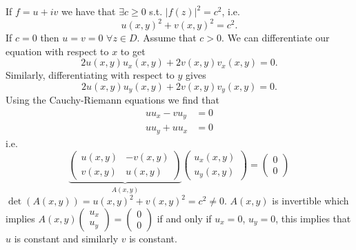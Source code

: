 \documentclass[10pt, a4paper]{article}
\begin{document}
\begin{problem}
\begin{solution}
        If $f = u + iv$ we have that $\exists c \geq 0$ s.t. $|f(z)| ^ 2 = c ^ 2$,
        i.e.
        \[
        u(x, y) ^ 2 + v(x, y) ^ 2 = c ^ 2.
        \]
        If $c = 0$ then $u = v = 0$ $\forall z \in D$.
        Assume that $c > 0$.
        We can differentiate our equation with respect to $x$ to get
        \[
        2u(x, y)u_x(x, y) + 2v(x, y)v_x(x, y) = 0.
        \]
        Similarly,
        differentiating with respect to $y$ gives
        \[
        2u(x, y)u_y(x, y) + 2v(x, y)v_y(x, y) = 0.
        \]
        Using the Cauchy-Riemann equations we find that
        \begin{align*}
            uu_x - vu_y &= 0 \\
            uu_y + uu_x &= 0
        \end{align*}
        i.e.
        \[
        \underbrace{\begin{pmatrix}
            u(x, y)  & -v(x, y) \\ v(x, y) & u(x, y)
        \end{pmatrix}}_{A(x, y)}
        \begin{pmatrix}
            u_x(x, y) \\ u_y(x, y)
        \end{pmatrix} = \begin{pmatrix}
            0 \\ 0
        \end{pmatrix}
        \]
        $\det(A(x, y)) = u(x, y) ^ 2 + v(x, y) ^ 2 = c ^ 2 \neq 0$.
        $A(x, y)$ is invertible which implies $A(x, y)\begin{pmatrix}
            u_x \\ u_y
        \end{pmatrix} = \begin{pmatrix}
            0 \\ 0
        \end{pmatrix}$ if and only if $u_x = 0$,
        $u_y = 0$,
        this implies that $u$ is constant and similarly $v$ is constant.
    \end{solution}
\end{problem}
\end{document}
